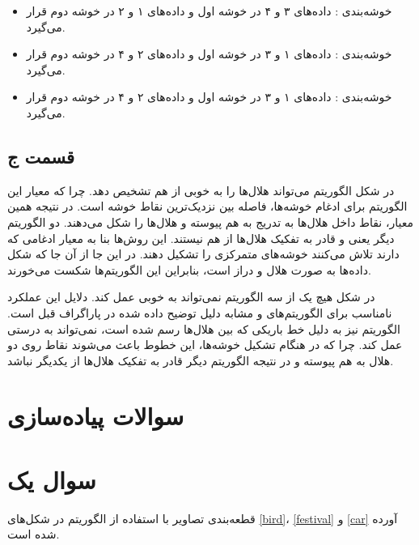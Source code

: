 \documentclass[12pt, a4paper]{article}
\begin{document}
\begin{itemize}
    \item خوشه‌بندی : داده‌های ۳ و ۴ در خوشه اول و داده‌های ۱ و ۲ در خوشه دوم قرار می‌گیرد.
    \item خوشه‌بندی : داده‌های ۱ و ۳ در خوشه اول و داده‌های ۲ و ۴ در خوشه دوم قرار می‌گیرد.
    \item خوشه‌بندی : داده‌های ۱ و ۳ در خوشه اول و داده‌های ۲ و ۴ در خوشه دوم قرار می‌گیرد.
\end{itemize}

\subsection*{قسمت ج}

در شکل  الگوریتم  می‌تواند هلال‌ها را به خوبی از هم تشخیص دهد. چرا که معیار این
الگوریتم برای ادغام خوشه‌ها، فاصله بین نزدیک‌ترین نقاط خوشه است. در نتیجه همین معیار، نقاط داخل هلال‌ها
به تدریج به هم پیوسته و هلال‌ها را شکل می‌دهند. دو الگوریتم دیگر یعنی  و 
قادر به تفکیک هلال‌ها از هم نیستند. این روش‌ها بنا به معیار ادغامی که دارند تلاش می‌کنند خوشه‌های متمرکزی را
تشکیل دهند. در این جا از آن جا که شکل داده‌ها به صورت هلال و دراز است، بنابراین این الگوریتم‌ها شکست می‌خورند.

در شکل  هیچ یک از سه الگوریتم نمی‌تواند به خوبی عمل کند. دلایل این عملکرد نامناسب برای الگوریتم‌های
 و  مشابه دلیل توضیح داده شده در پاراگراف قبل است. الگوریتم
 نیز به دلیل خط باریکی که بین هلال‌ها رسم شده است، نمی‌تواند به درستی عمل کند. چرا که
در هنگام تشکیل خوشه‌ها، این خطوط باعث می‌شوند نقاط روی دو هلال به هم پیوسته و در نتیجه الگوریتم دیگر
قادر به تفکیک هلال‌ها از یکدیگر نباشد.

\clearpage

\section*{سوالات پیاده‌سازی}
\section*{سوال یک}

قطعه‌بندی تصاویر با استفاده از الگوریتم  در شکل‌های \ref{bird}،
\ref{festival} و \ref{car} آورده شده است.
\end{document}
